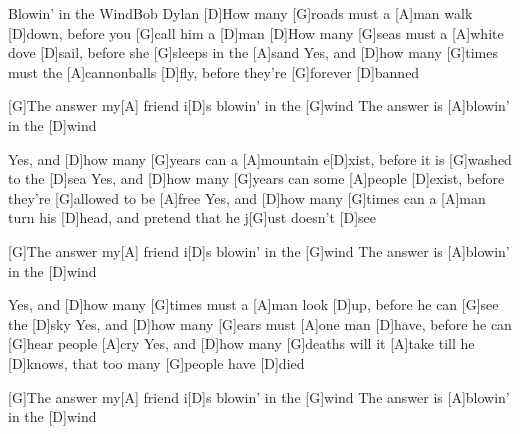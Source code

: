 \documentclass[../main.tex]{subfiles}
\begin{document}
\begin{song}[2]{Blowin' in the Wind}{Bob Dylan}{}
[D]How many [G]roads must a [A]man walk [D]down,
before you [G]call him a [D]man
[D]How many [G]seas must a [A]white dove [D]sail,
before she [G]sleeps in the [A]sand
Yes, and [D]how many [G]times must the [A]cannonballs [D]fly,
before they're [G]forever [D]banned

[G]The answer my[A] friend i[D]s blowin' in the [G]wind
The answer is [A]blowin' in the [D]wind

Yes, and [D]how many [G]years can a [A]mountain e[D]xist,
before it is [G]washed to the [D]sea
Yes, and [D]how many [G]years can some [A]people [D]exist,
before they're [G]allowed to be [A]free
Yes, and [D]how many [G]times can a [A]man turn his [D]head,
and pretend that he j[G]ust doesn't [D]see

[G]The answer my[A] friend i[D]s blowin' in the [G]wind
The answer is [A]blowin' in the [D]wind

Yes, and [D]how many [G]times must a [A]man look [D]up,
before he can [G]see the [D]sky
Yes, and [D]how many [G]ears must [A]one man [D]have,
before he can [G]hear people [A]cry
Yes, and [D]how many [G]deaths will it [A]take till he [D]knows,
that too many [G]people have [D]died

[G]The answer my[A] friend i[D]s blowin' in the [G]wind
The answer is [A]blowin' in the [D]wind
\end{song}
\end{document}
